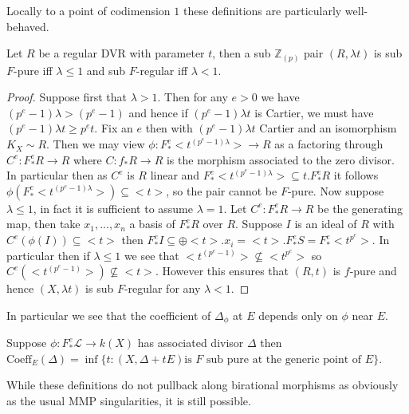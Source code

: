 \documentclass[a4paper,12pt]{book}
\newcommand{\Fe}{F^{e}_{*}}
\newcommand{\zp}{\mathbb{Z}_{(p)}}
\begin{document}
Locally to a point of codimension $1$ these definitions are particularly well-behaved.

\begin{lemma}
	Let $R$ be a regular DVR with parameter $t$, then a sub $\zp$ pair $(R,\lambda t)$ is sub $F$-pure iff $\lambda \leq 1$ and sub $F$-regular iff $\lambda < 1$.
\end{lemma}
\begin{proof}
	Suppose first that $\lambda > 1$. Then for any $e >0$ we have $(p^{e}-1)\lambda >(p^{e}-1)$ and hence if $(p^{e}-1)\lambda t$ is Cartier, we must have $(p^{e}-1)\lambda t \geq p^{e} t$. Fix an $e$ then with $(p^{e}-1)\lambda t$ Cartier and an isomorphism $K_{X}\sim R$. Then we may view $\phi: \Fe <t^{(p^{e}-1)\lambda}> \to R$ as a factoring through $C^{e}: \Fe R \to R$ where $C:f_{*}R \to R$ is the morphism associated to the zero divisor. In particular then as $C^{e}$ is $R$ linear and $\Fe <t^{(p^{e}-1)\lambda}> \subseteq t.\Fe R$ it follows $\phi(\Fe <t^{(p^{e}-1)\lambda}> ) \subseteq <t>$, so the pair cannot be $F$-pure.
	Now suppose $\lambda \leq 1$, in fact it is sufficient to assume $\lambda =1$.
	Let $C^{e}:\Fe R \to R$ be the generating map, then take $x_{1},...,x_{n}$ a basis of $\Fe R$ over $R$. Suppose $I$ is an ideal of $R$ with $C^{e}(\phi(I)) \subseteq <t>$ then $\Fe I \subseteq \oplus <t>.x_{i} =<t>.\Fe S= \Fe <t^{p^{e}}>$. In particular then if $\lambda \leq 1$ we see that  $<t^{(p^{e}-1)}>\not\subseteq <t^{p^{e}}>$ so $C^{e}(<t^{(p^{e}-1)}>) \not\subseteq <t>$. However this ensures that $(R,t)$ is $f$-pure and hence $(X,\lambda t)$ is sub $F$-regular for any $\lambda <1$.   
	\end{proof}
In particular we see that the coefficient of $\Delta_{\phi}$ at $E$ depends only on $\phi$ near $E$.

\begin{corollary}\label{local}
	Suppose $\phi:\Fe\mathcal{L} \to k(X)$ has associated divisor $\Delta$ then $\text{Coeff}_{E}(\Delta)=\inf\{t: (X,\Delta+tE) \text{is } F \text{ sub pure at the generic point of } E\}$. 
\end{corollary}

While these definitions do not pullback along birational morphisms as obviously as the usual MMP singularities, it is still possible.
\end{document}
